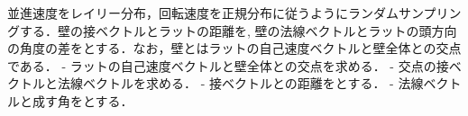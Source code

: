 並進速度をレイリー分布，回転速度を正規分布に従うようにランダムサンプリングする．壁の接ベクトルとラットの距離を, 壁の法線ベクトルとラットの頭方向の角度の差をとする．なお，壁とはラットの自己速度ベクトルと壁全体との交点である．
- ラットの自己速度ベクトルと壁全体との交点を求める．
- 交点の接ベクトルと法線ベクトルを求める．
- 接ベクトルとの距離をとする．
- 法線ベクトルと成す角をとする．